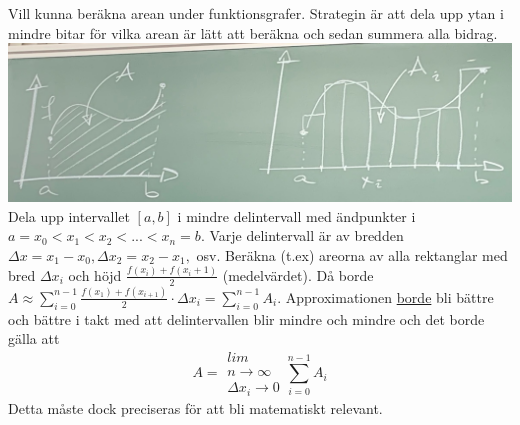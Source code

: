 Vill kunna beräkna arean under funktionsgrafer.
Strategin är att dela upp ytan i mindre bitar för vilka arean är lätt att beräkna och sedan summera alla bidrag.\\
\includegraphics[scale=0.1]{lessons/lesson14/imgs/img01.jpg}
Dela upp intervallet $[a,b]$ i mindre delintervall med ändpunkter i $a=x_0<x_1<x_2<...<x_n=b$.
Varje delintervall är av bredden $\Delta x=x_1-x_0,\Delta x_2=x_2-x_1,$ osv.
Beräkna (t.ex) areorna av alla rektanglar med bred $\Delta x_i$ och höjd $\frac{f(x_i)+f(x_i+1)}{2}$ (medelvärdet).
Då borde $A\approx \sum_{i=0}^{n-1}\frac{f(x_1)+f(x_{i+1})}{2}\cdot\Delta x_i=\sum_{i=0}^{n-1} A_i$.
Approximationen \underline{borde} bli bättre och bättre i takt med att delintervallen blir mindre och mindre och det borde gälla att
\begin{equation*}
    A=\begin{matrix}
        lim        \\
        n\to\infty \\
        \Delta x_i\to 0
    \end{matrix}\sum_{i=0}^{n-1}A_i
\end{equation*}
Detta måste dock preciseras för att bli matematiskt relevant.


